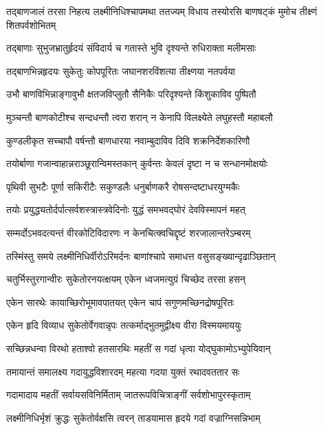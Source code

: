 
\fourlineindentedshloka
{तद्बाणजालं तरसा निहत्य}
{लक्ष्मीनिधिश्चापमथा ततज्यम्}
{विधाय तस्योरसि बाणषट्कं}
{मुमोच तीक्ष्णं शितपर्वशोभितम्}%

\twolineshloka
{तद्बाणाः सुभुजभ्रातुर्हृदयं संविदार्य च}
{गतास्ते भुवि दृश्यन्ते रुधिराक्ता मलीमसाः}%

\twolineshloka
{तद्बाणभिन्नहृदयः सुकेतुः कोपपूरितः}
{जघानशरविंशत्या तीक्ष्णया नतपर्वया}%

\twolineshloka
{उभौ बाणविभिन्नाङ्गावुभौ क्षतजविप्लुतौ}
{सैनिकैः परिदृश्यन्ते किंशुकाविव पुष्पितौ}%

\twolineshloka
{मुञ्चन्तौ बाणकोटीश्च सन्दधन्तौ त्वरा शरान्}
{न केनापि विलक्ष्येते लघुहस्तौ महाबलौ}%

\twolineshloka
{कुण्डलीकृत सच्चापौ वर्षन्तौ बाणधारया}
{नवाम्बुदाविव दिवि शक्रनिर्देशकारिणौ}%

\twolineshloka
{तयोर्बाणा गजान्वाहान्नराञ्छूरान्विमस्तकान्}
{कुर्वन्तः केवलं दृष्टा न च सन्धानमोक्षयोः}%

\twolineshloka
{पृथिवी सुभटैः पूर्णा सकिरीटैः सकुण्डलैः}
{धनुर्बाणकरै रोषसन्दष्टाधरयुग्मकैः}%

\twolineshloka
{तयोः प्रयुद्ध्यतोर्दर्पात्सर्वशस्त्रास्त्रवेदिनोः}
{युद्धं समभवद्घोरं देवविस्मापनं महत्}%

\twolineshloka
{सम्मर्दोऽभवदत्यन्तं वीरकोटिविदारणः}
{न केनचित्क्वचिद्दृष्टं शरजालान्तरेऽम्बरम्}%

\twolineshloka
{तस्मिंस्तु समये लक्ष्मीनिधिर्वीरोऽरिमर्दनः}
{बाणांश्चापे समाधत्त वसुसङ्ख्यान्दृढाञ्छितान्}%

\twolineshloka
{चतुर्भिस्तुरगान्वीरः सुकेतोरनयत्क्षयम्}
{एकेन ध्वजमत्युग्रं चिच्छेद तरसा हसन्}%

\twolineshloka
{एकेन सारथेः कायाच्छिरोभूमावपातयत्}
{एकेन चापं सगुणमच्छिनद्रोषपूरितः}%

\twolineshloka
{एकेन हृदि विव्याध सुकेतोर्वेगवान्नृपः}
{तत्कर्माद्भुतमुद्वीक्ष्य वीरा विस्मयमाययुः}%

\twolineshloka
{सच्छिन्नधन्वा विरथो हताश्वो हतसारथिः}
{महतीं स गदां धृत्वा योद्घुकामोऽभ्युपेयिवान्}%

\twolineshloka
{तमायान्तं समालक्ष्य गदायुद्धविशारदम्}
{महत्या गदया युक्तं रथादवततार सः}%

\twolineshloka
{गदामादाय महतीं सर्वायसविनिर्मिताम्}
{जातरूपविचित्राङ्गीं सर्वशोभापुरस्कृताम्}%

\twolineshloka
{लक्ष्मीनिधिर्भृशं क्रुद्धः सुकेतोर्वक्षसि त्वरन्}
{ताडयामास हृदये गदां वज्राग्निसन्निभाम्}%

